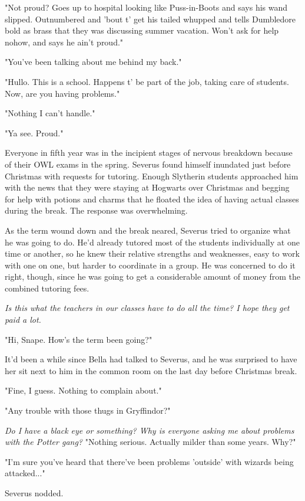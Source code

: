\documentclass[a4paper,11pt]{article}
\begin{document}
"Not proud? Goes up to hospital looking like Puss-in-Boots and says his wand slipped. Outnumbered and 'bout t' get his tailed whupped and tells Dumbledore bold as brass that they was discussing summer vacation. Won't ask for help nohow, and says he ain't proud."

"You've been talking about me behind my back."

"Hullo. This is a school. Happens t' be part of the job, taking care of students. Now, are you having problems."

"Nothing I can't handle."

"Ya see. Proud."

Everyone in fifth year was in the incipient stages of nervous breakdown because of their OWL exams in the spring. Severus found himself inundated just before Christmas with requests for tutoring. Enough Slytherin students approached him with the news that they were staying at Hogwarts over Christmas and begging for help with potions and charms that he floated the idea of having actual classes during the break. The response was overwhelming.

As the term wound down and the break neared, Severus tried to organize what he was going to do. He'd already tutored most of the students individually at one time or another, so he knew their relative strengths and weaknesses, easy to work with one on one, but harder to coordinate in a group. He was concerned to do it right, though, since he was going to get a considerable amount of money from the combined tutoring fees.

\emph{Is this what the teachers in our classes have to do all the time? I hope they get paid a lot.}

"Hi, Snape. How's the term been going?"

It'd been a while since Bella had talked to Severus, and he was surprised to have her sit next to him in the common room on the last day before Christmas break.

"Fine, I guess. Nothing to complain about."

"Any trouble with those thugs in Gryffindor?"

\emph{Do I have a black eye or something? Why is everyone asking me about problems with the Potter gang?} "Nothing serious. Actually milder than some years. Why?"

"I'm sure you've heard that there've been problems 'outside' with wizards being attacked..."

Severus nodded.
\end{document}
